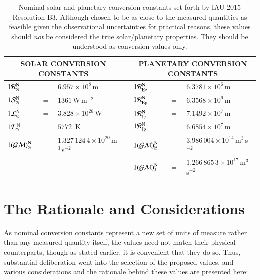 \documentclass[preprint]{aastex}
\newcommand{\Rnom}{\hbox{$\mathcal{R}^{\mathrm N}_\odot$}}
\newcommand{\Snom}{\hbox{$\mathcal{S}^{\mathrm N}_\odot$}}
\newcommand{\Lnom}{\hbox{$\mathcal{L}^{\mathrm N}_\odot$}}
\newcommand{\Tnom}{\hbox{$\mathcal{T}^{\mathrm N}_\odot$}}
\newcommand{\GMnom}{\hbox{$\mathcal{(GM)}^{\mathrm N}_\odot$}}
\newcommand{\REenom}{\hbox{$\mathcal{R}^{\mathrm N}_\mathrm{Ee}$}}
\newcommand{\REpnom}{\hbox{$\mathcal{R}^{\mathrm N}_\mathrm{Ep}$}}
\newcommand{\RJenom}{\hbox{$\mathcal{R}^{\mathrm N}_\mathrm{Je}$}}
\newcommand{\RJpnom}{\hbox{$\mathcal{R}^{\mathrm N}_\mathrm{Jp}$}}
\newcommand{\GMEnom}{\hbox{$\mathcal{(GM)}^{\mathrm N}_\mathrm{E}$}}
\newcommand{\GMJnom}{\hbox{$\mathcal{(GM)}^{\mathrm N}_\mathrm{J}$}}
\begin{document}
\begin{table}[t]
\begin{center}
\begin{tabular}{lclclcl}
\hline \hline
\multicolumn{3}{c}{SOLAR CONVERSION CONSTANTS}                         & \phantom{space} & \multicolumn{3}{c}{PLANETARY CONVERSION CONSTANTS} \\
\hline
$1 \Rnom$  & $=$ & $6.957 \times 10^8$\,m                              & \phantom{space} & $1 \REenom$ & $=$ & $6.3781 \times 10^6$\,m \\
$1 \Snom$  & $=$ & $1361$\,W\,m${}^{-2}$                               & \phantom{space} & $1 \REpnom$ & $=$ & $6.3568 \times 10^6$\,m \\
$1 \Lnom$  & $=$ & $3.828 \times 10^{26}$\,W                           & \phantom{space} & $1 \RJenom$ & $=$ & $7.1492 \times 10^7$\,m \\
$1 \Tnom$  & $=$ & $5772$\, K                                          & \phantom{space} & $1 \RJpnom$ & $=$ & $6.6854 \times 10^7$\,m \\
$1 \GMnom$ & $=$ & $1.327\,124\,4 \times 10^{20}$\,m${}^3$\,s${}^{-2}$ & \phantom{space} & $1 \GMEnom$ & $=$ & $3.986\,004 \times 10^{14}$\,m${}^3$\,s${}^{-2}$ \\
           &     &                                                     & \phantom{space} & $1 \GMJnom$ & $=$ & $1.266\,865\,3 \times 10^{17}$\,m${}^3$\,s${}^{-2}$ \\
\hline
\end{tabular}
\caption{
\label{tab:nompars}
Nominal solar and planetary conversion constants set forth by IAU 2015 Resolution B3. Although chosen to be as close to the measured quantities as feasible given the observational uncertainties for practical reasons, these values should \emph{not} be considered the true solar/planetary properties. They should be understood as conversion values only.
}
\end{center}
\end{table}

\section{The Rationale and Considerations}

As nominal conversion constants represent a new set of units of measure rather than any measured quantity itself, the values need not match their physical counterparts, though as stated earlier, it is convenient that they do so. Thus, substantial deliberation went into the selection of the proposed values, and various considerations and the rationale behind these values are presented here:
\end{document}
